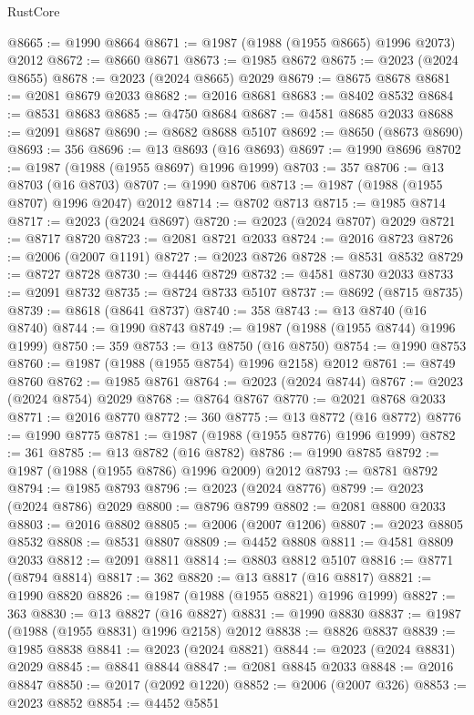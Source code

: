 \begin{lexlean}{RustCore}
\begin{coremodule}
@8665 := @1990 @8664
@8671 := @1987 (@1988 (@1955 @8665) @1996 @2073) @2012
@8672 := @8660 @8671
@8673 := @1985 @8672
@8675 := @2023 (@2024 @8655)
@8678 := @2023 (@2024 @8665) @2029
@8679 := @8675 @8678
@8681 := @2081 @8679 @2033
@8682 := @2016 @8681
@8683 := @8402 @8532
@8684 := @8531 @8683
@8685 := @4750 @8684
@8687 := @4581 @8685 @2033
@8688 := @2091 @8687
@8690 := @8682 @8688 @5107
@8692 := @8650 (@8673 @8690)
@8693 := 356
@8696 := @13 @8693 (@16 @8693)
@8697 := @1990 @8696
@8702 := @1987 (@1988 (@1955 @8697) @1996 @1999)
@8703 := 357
@8706 := @13 @8703 (@16 @8703)
@8707 := @1990 @8706
@8713 := @1987 (@1988 (@1955 @8707) @1996 @2047) @2012
@8714 := @8702 @8713
@8715 := @1985 @8714
@8717 := @2023 (@2024 @8697)
@8720 := @2023 (@2024 @8707) @2029
@8721 := @8717 @8720
@8723 := @2081 @8721 @2033
@8724 := @2016 @8723
@8726 := @2006 (@2007 @1191)
@8727 := @2023 @8726
@8728 := @8531 @8532
@8729 := @8727 @8728
@8730 := @4446 @8729
@8732 := @4581 @8730 @2033
@8733 := @2091 @8732
@8735 := @8724 @8733 @5107
@8737 := @8692 (@8715 @8735)
@8739 := @8618 (@8641 @8737)
@8740 := 358
@8743 := @13 @8740 (@16 @8740)
@8744 := @1990 @8743
@8749 := @1987 (@1988 (@1955 @8744) @1996 @1999)
@8750 := 359
@8753 := @13 @8750 (@16 @8750)
@8754 := @1990 @8753
@8760 := @1987 (@1988 (@1955 @8754) @1996 @2158) @2012
@8761 := @8749 @8760
@8762 := @1985 @8761
@8764 := @2023 (@2024 @8744)
@8767 := @2023 (@2024 @8754) @2029
@8768 := @8764 @8767
@8770 := @2021 @8768 @2033
@8771 := @2016 @8770
@8772 := 360
@8775 := @13 @8772 (@16 @8772)
@8776 := @1990 @8775
@8781 := @1987 (@1988 (@1955 @8776) @1996 @1999)
@8782 := 361
@8785 := @13 @8782 (@16 @8782)
@8786 := @1990 @8785
@8792 := @1987 (@1988 (@1955 @8786) @1996 @2009) @2012
@8793 := @8781 @8792
@8794 := @1985 @8793
@8796 := @2023 (@2024 @8776)
@8799 := @2023 (@2024 @8786) @2029
@8800 := @8796 @8799
@8802 := @2081 @8800 @2033
@8803 := @2016 @8802
@8805 := @2006 (@2007 @1206)
@8807 := @2023 @8805 @8532
@8808 := @8531 @8807
@8809 := @4452 @8808
@8811 := @4581 @8809 @2033
@8812 := @2091 @8811
@8814 := @8803 @8812 @5107
@8816 := @8771 (@8794 @8814)
@8817 := 362
@8820 := @13 @8817 (@16 @8817)
@8821 := @1990 @8820
@8826 := @1987 (@1988 (@1955 @8821) @1996 @1999)
@8827 := 363
@8830 := @13 @8827 (@16 @8827)
@8831 := @1990 @8830
@8837 := @1987 (@1988 (@1955 @8831) @1996 @2158) @2012
@8838 := @8826 @8837
@8839 := @1985 @8838
@8841 := @2023 (@2024 @8821)
@8844 := @2023 (@2024 @8831) @2029
@8845 := @8841 @8844
@8847 := @2081 @8845 @2033
@8848 := @2016 @8847
@8850 := @2017 (@2092 @1220)
@8852 := @2006 (@2007 @326)
@8853 := @2023 @8852
@8854 := @4452 @5851

\end{coremodule}
\end{lexlean}
